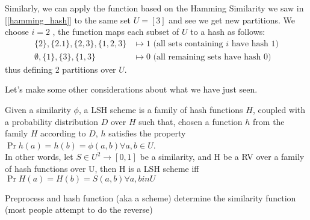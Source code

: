 \ex Similarly, we can apply the function based on the Hamming Similarity we saw in [\ref{hamming_hash}] to the same set $U=[3]$ and see we get new partitions. We choose $i = 2$ \uar, the function maps each subset of $U$ to a hash as follows:
\begin{align*}
\{2\}, \{2.1\}, \{2,3\}, \{1,2,3\} &\mapsto 1 \text{ (all sets containing $i$ have hash 1)} \\
\emptyset, \{1\}, \{3\}, \{1,3\} &\mapsto 0 \text{ (all remaining sets have hash 0)}
\end{align*}
thus defining 2 partitions over $U$.

Let's make some other considerations about what we have just seen.





\obs Given a similarity $\phi$, a LSH scheme is a family of hash functions $H$, coupled with a probability distribution $D$ over $H$ such that, chosen a function $h$ from the family $H$ according to $D$, $h$ satisfies the property $\Pr{h(a)=h(b)} = \phi(a,b) \forall a,b \in U$. \\
In other words, let $S \in U^2 \to [0, 1]$ be a similarity, and H be a RV over a family of hash functions over U, then H is a LSH scheme iff $\Pr{H(a)=H(b)} = S(a,b) \forall a,b in U$






\obs Preprocess and hash function (aka a scheme) determine the similarity function (most people attempt to do the reverse)

